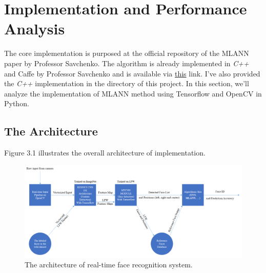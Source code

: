 \chapter{Implementation and Performance Analysis}

The core implementation is purposed at the official repository of the MLANN paper by Professor Savchenko. The algorithm is already implemented in \textit{C++} and Caffe by Professor Savchenko and is available via \href{https://github.com/HSE-asavchenko/HSE_FaceRec/tree/master/src}{this} link. I've also provided the \textit{C++} implementation in the directory of this project. In this section, we'll analyze the implementation of MLANN method using Tensorflow and OpenCV in Python.

\section{The Architecture}
Figure 3.1 illustrates the overall architecture of implementation.
\begin{figure}[!h]\centering
	\includegraphics[width=1.1\textwidth]{diagram.PNG}
	\caption{The architecture of real-time face recognition system.}
	\label{pl1}
\end{figure}

